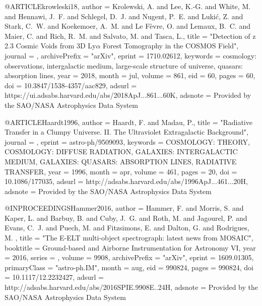 \documentclass{aa}
\begin{document}
{{{{@ARTICLE{krowleski18,
   author = {{Krolewski}, A. and {Lee}, K.-G. and {White}, M. and {Hennawi}, J.~F. and 
	{Schlegel}, D.~J. and {Nugent}, P.~E. and {Luki{\'c}}, Z. and 
	{Stark}, C.~W. and {Koekemoer}, A.~M. and {Le F{\`e}vre}, O. and 
	{Lemaux}, B.~C. and {Maier}, C. and {Rich}, R.~M. and {Salvato}, M. and 
	{Tasca}, L.},
    title = "{Detection of z {\tilde} 2.3 Cosmic Voids from 3D Ly{$\alpha$} Forest Tomography in the COSMOS Field}",
  journal = {\apj},
archivePrefix = "arXiv",
   eprint = {1710.02612},
 keywords = {cosmology: observations, intergalactic medium, large-scale structure of universe, quasars: absorption lines},
     year = 2018,
    month = jul,
   volume = 861,
      eid = {60},
    pages = {60},
      doi = {10.3847/1538-4357/aac829},
   adsurl = {https://ui.adsabs.harvard.edu/abs/2018ApJ...861...60K},
  adsnote = {Provided by the SAO/NASA Astrophysics Data System}
}


@ARTICLE{Haardt1996,
   author = {{Haardt}, F. and {Madau}, P.},
    title = "{Radiative Transfer in a Clumpy Universe. II. The Ultraviolet Extragalactic Background}",
  journal = {\apj},
   eprint = {astro-ph/9509093},
 keywords = {COSMOLOGY: THEORY, COSMOLOGY: DIFFUSE RADIATION, GALAXIES: INTERGALACTIC MEDIUM, GALAXIES: QUASARS: ABSORPTION LINES, RADIATIVE TRANSFER},
     year = 1996,
    month = apr,
   volume = 461,
    pages = {20},
      doi = {10.1086/177035},
   adsurl = {http://adsabs.harvard.edu/abs/1996ApJ...461...20H},
  adsnote = {Provided by the SAO/NASA Astrophysics Data System}
}

@INPROCEEDINGS{Hammer2016,
   author = {{Hammer}, F. and {Morris}, S. and {Kaper}, L. and {Barbuy}, B. and 
	{Cuby}, J.~G. and {Roth}, M. and {Jagourel}, P. and {Evans}, C.~J. and 
	{Puech}, M. and {Fitzsimons}, E. and {Dalton}, G. and {Rodrigues}, M.
	},
    title = "{The E-ELT multi-object spectrograph: latest news from MOSAIC}",
booktitle = {Ground-based and Airborne Instrumentation for Astronomy VI},
     year = 2016,
   series = {\procspie},
   volume = 9908,
archivePrefix = "arXiv",
   eprint = {1609.01305},
 primaryClass = "astro-ph.IM",
    month = aug,
      eid = {990824},
    pages = {990824},
      doi = {10.1117/12.2232427},
   adsurl = {http://adsabs.harvard.edu/abs/2016SPIE.9908E..24H},
  adsnote = {Provided by the SAO/NASA Astrophysics Data System}
}

}}}}
\end{document}
